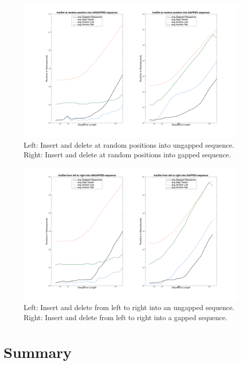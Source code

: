 \documentclass[11pt, letterpaper, twoside]{article}
\begin{document}
\begin{figure}[htpb]\centering
\includegraphics[scale=.4,trim={5cm 2cm 4.5cm 1.5cm},clip]{benchmark2_plot.png}
\caption{Left: Insert and delete at random positions into ungapped sequence. Right: 
Insert and delete at random positions into gapped sequence.}
\end{figure}

\begin{figure}[htpb]\centering
\includegraphics[scale=.4,trim={5cm 2cm 4.5cm 1.5cm},clip]{benchmark3_plot.png}
\caption{Left: Insert and delete from left to right into an ungapped sequence. Right: 
Insert and delete from left to right into a gapped sequence.}
\end{figure}

\section{Summary}
\end{document}
